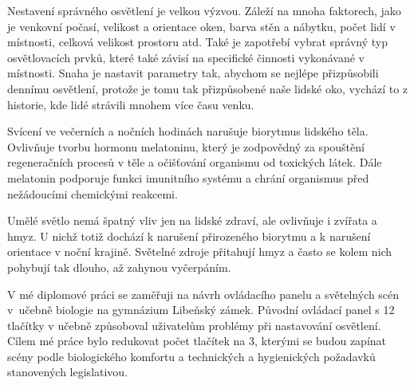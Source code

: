 
\medskip
Nestavení správného osvětlení je velkou výzvou. Záleží na mnoha faktorech, jako je venkovní počasí, velikost a orientace oken,
barva stěn a nábytku, počet lidí v místnosti, celková velikost prostoru atd. Také je zapotřebí vybrat správný typ osvětlovacích prvků,
které také závisí na specifické činnosti vykonávané v místnosti. Snaha je nastavit parametry tak, abychom se nejlépe přizpůsobili
dennímu osvětlení, protože je tomu tak přizpůsobené naše lidské oko, vychází to z historie, kde lidé strávili mnohem více času venku.

\medskip
Svícení ve večerních a nočních hodinách narušuje biorytmus lidského těla. Ovlivňuje tvorbu hormonu melatoninu, který je
zodpovědný za spouštění regeneračních procesů v těle a očišťování organismu od toxických látek. Dále melatonin podporuje
funkci imunitního systému a chrání organismus před nežádoucími chemickými reakcemi.

\medskip
Umělé světlo nemá špatný vliv jen na lidské zdraví, ale ovlivňuje i zvířata a hmyz. U nichž totiž dochází k narušení
přirozeného biorytmu a k narušení orientace v noční krajině. Světelné zdroje přitahují hmyz a často se kolem nich
pohybují tak dlouho, až zahynou vyčerpáním.


\medskip
V mé diplomové práci se zaměřuji na návrh ovládacího panelu a světelných scén v~učebně biologie na
gymnázium Libeňský zámek. Původní ovládací panel s 12 tlačítky v učebně způsoboval uživatelům problémy při
nastavování osvětlení. Cílem mé práce bylo redukovat počet tlačítek na 3, kterými se budou zapínat scény
podle biologického komfortu a technických a hygienických požadavků stanovených legislativou.

